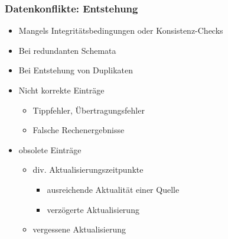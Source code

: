     
    \begin{frame}
    \frametitle{Datenkonflikte: Entstehung}
    
    \begin{itemize}
    \item Mangels Integritätsbedingungen oder Konsistenz-Checks
    \item Bei redundanten Schemata
    \item Bei Entstehung von Duplikaten
    \item Nicht korrekte Einträge
    \begin{itemize}
    \item Tippfehler, Übertragungsfehler
    \item Falsche Rechenergebnisse
    \end{itemize}
    \item obsolete Einträge
    \begin{itemize}
    \item div. Aktualisierungszeitpunkte
    \begin{itemize}
    \item ausreichende Aktualität einer Quelle
    \item verzögerte Aktualisierung
    \end{itemize}
    \item vergessene Aktualisierung
    \end{itemize}
    \end{itemize}
    
    
    \end{frame}
    
    
    

